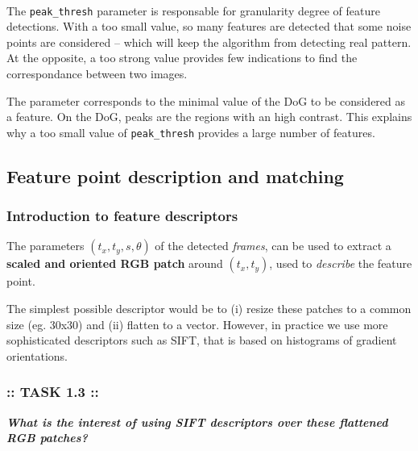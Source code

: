 \documentclass[11pt]{article}
\begin{document}
    \begin{center}
    \end{center}
    { \hspace*{\fill} \\}
    
    The \texttt{peak\_thresh} parameter is responsable for granularity
degree of feature detections. With a too small value, so many features
are detected that some noise points are considered -- which will keep
the algorithm from detecting real pattern. At the opposite, a too strong
value provides few indications to find the correspondance between two
images.

The parameter corresponds to the minimal value of the DoG to be
considered as a feature. On the DoG, peaks are the regions with an high
contrast. This explains why a too small value of \texttt{peak\_thresh}
provides a large number of features.

    \hypertarget{feature-point-description-and-matching}{%
\subsection{Feature point description and
matching}\label{feature-point-description-and-matching}}

    \hypertarget{introduction-to-feature-descriptors}{%
\subsubsection{Introduction to feature
descriptors}\label{introduction-to-feature-descriptors}}

The parameters \((t_x, t_y, s, \theta)\) of the detected \emph{frames},
can be used to extract a \textbf{scaled and oriented RGB patch} around
\((t_x,t_y)\), used to \emph{describe} the feature point.

The simplest possible descriptor would be to (i) resize these patches to
a common size (eg. 30x30) and (ii) flatten to a vector. However, in
practice we use more sophisticated descriptors such as SIFT, that is
based on histograms of gradient orientations.

    \hypertarget{task-1.3}{%
\subsubsection{:: TASK 1.3 ::}\label{task-1.3}}

\textbf{\emph{What is the interest of using SIFT descriptors over these
flattened RGB patches?}}
\end{document}
